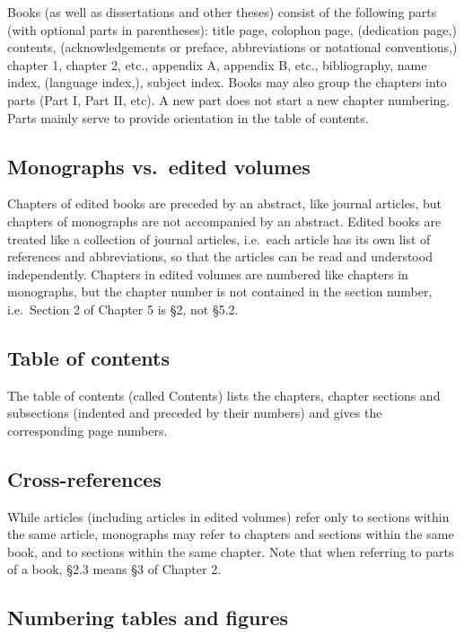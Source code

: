\documentclass[a4paper]{article}
\newcommand{\gsrex}[1]{{\color{blue}#1}}
\begin{document}
Books (as well as dissertations and other theses) consist of the
following parts (with optional parts in parentheses): title page,
colophon page, (dedication page,) contents, (acknowledgements or
preface, abbreviations or notational conventions,) chapter 1, chapter 2,
etc., appendix A, appendix B, etc., bibliography, name index, (language
index,), subject index. Books may also group the chapters into parts
(Part I, Part II, etc). A new part does not start a new chapter
numbering. Parts mainly serve to provide orientation in the table of
contents.

\subsection{Monographs vs.~edited volumes}\label{sec:monographs-vs.edited-volumes}

Chapters of edited books are preceded by an abstract, like journal
articles, but chapters of monographs are not accompanied by an abstract.
Edited books are treated like a collection of journal articles,
i.e.~each article has its own list of references and abbreviations, so
that the articles can be read and understood independently. Chapters in
edited volumes are numbered like chapters in monographs, but the chapter
number is not contained in the section number, i.e.~Section 2 of Chapter
5 is §2, not §5.2.

\subsection{Table of contents}\label{sec:table-of-contents}

The table of contents (called \gsrex{Contents}) lists the chapters, chapter
sections and subsections (indented and preceded by their numbers) and
gives the corresponding page numbers.

\subsection{Cross-references}\label{sec:cross-references}

While articles (including articles in edited volumes) refer only to
sections within the same article, monographs may refer to chapters and
sections within the same book, and to sections within the same chapter.
Note that when referring to parts of a book, \gsrex{§2.3} means §3 of Chapter 2.

\subsection{Numbering tables and figures}\label{sec:numbering-tables-and-figures}
\end{document}
